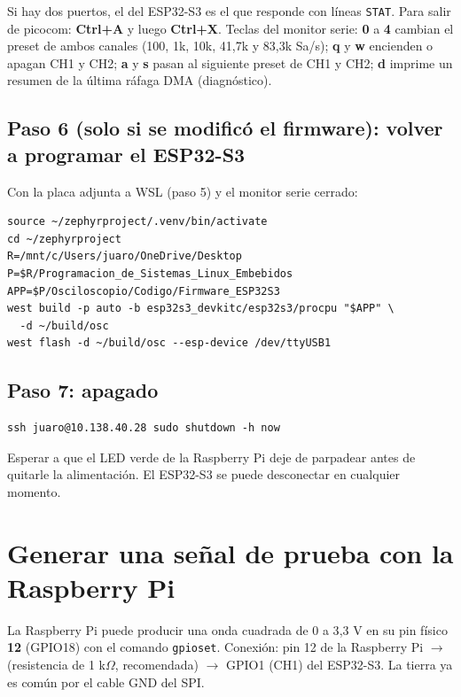 \documentclass[12pt,a4paper]{article}
\begin{document}
Si hay dos puertos, el del ESP32-S3 es el que responde con líneas \texttt{STAT}. Para salir de picocom: \textbf{Ctrl+A} y luego \textbf{Ctrl+X}. Teclas del monitor serie: \textbf{0} a \textbf{4} cambian el preset de ambos canales (100, 1k, 10k, 41,7k y 83,3k Sa/s); \textbf{q} y \textbf{w} encienden o apagan CH1 y CH2; \textbf{a} y \textbf{s} pasan al siguiente preset de CH1 y CH2; \textbf{d} imprime un resumen de la última ráfaga DMA (diagnóstico).

\subsection{Paso 6 (solo si se modificó el firmware): volver a programar el ESP32-S3}

Con la placa adjunta a WSL (paso 5) y el monitor serie cerrado:

\begin{verbatim}
source ~/zephyrproject/.venv/bin/activate
cd ~/zephyrproject
R=/mnt/c/Users/juaro/OneDrive/Desktop
P=$R/Programacion_de_Sistemas_Linux_Embebidos
APP=$P/Osciloscopio/Codigo/Firmware_ESP32S3
west build -p auto -b esp32s3_devkitc/esp32s3/procpu "$APP" \
  -d ~/build/osc
west flash -d ~/build/osc --esp-device /dev/ttyUSB1
\end{verbatim}

\subsection{Paso 7: apagado}

\begin{verbatim}
ssh juaro@10.138.40.28 sudo shutdown -h now
\end{verbatim}

Esperar a que el LED verde de la Raspberry Pi deje de parpadear antes de quitarle la alimentación. El ESP32-S3 se puede desconectar en cualquier momento.

\section{Generar una señal de prueba con la Raspberry Pi}

La Raspberry Pi puede producir una onda cuadrada de 0 a 3{,}3 V en su pin físico \textbf{12} (GPIO18) con el comando \texttt{gpioset}. Conexión: pin 12 de la Raspberry Pi $\rightarrow$ (resistencia de 1 k$\Omega$, recomendada) $\rightarrow$ GPIO1 (CH1) del ESP32-S3. La tierra ya es común por el cable GND del SPI.
\end{document}
